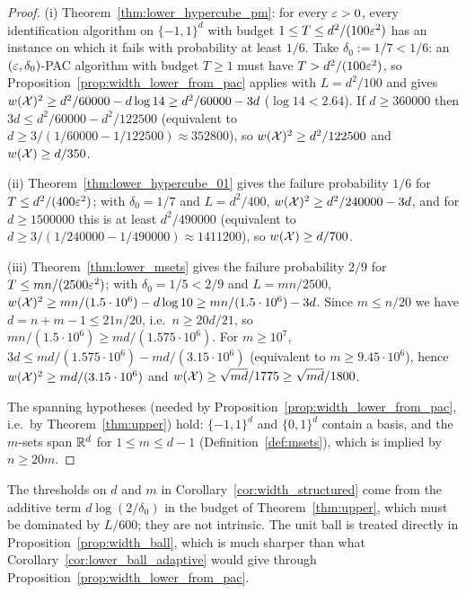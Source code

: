 \begin{proof}
(i) Theorem~\ref{thm:lower_hypercube_pm}: for every $\varepsilon > 0$, every identification
algorithm on $\{-1,1\}^d$ with budget $1 \le T \le d^2/(100\varepsilon^2)$ has an instance on which it
fails with probability at least $1/6$. Take $\delta_0 := 1/7 < 1/6$: an
$(\varepsilon,\delta_0)$-PAC algorithm with budget $T \ge 1$ must have $T > d^2/(100\varepsilon^2)$, so
Proposition~\ref{prop:width_lower_from_pac} applies with $L = d^2/100$ and gives
$w(\mathcal{X})^2 \ge d^2/60000 - d\log 14 \ge d^2/60000 - 3d$ ($\log 14 < 2.64$). If
$d \ge 360000$ then $3d \le d^2/60000 - d^2/122500$ (equivalent to
$d \ge 3/(1/60000 - 1/122500) \approx 352800$), so $w(\mathcal{X})^2 \ge d^2/122500$ and
$w(\mathcal{X}) \ge d/350$.

(ii) Theorem~\ref{thm:lower_hypercube_01} gives the failure probability $1/6$ for
$T \le d^2/(400\varepsilon^2)$; with $\delta_0 = 1/7$ and $L = d^2/400$,
$w(\mathcal{X})^2 \ge d^2/240000 - 3d$, and for $d \ge 1500000$ this is at least
$d^2/490000$ (equivalent to $d \ge 3/(1/240000 - 1/490000) \approx 1411200$), so
$w(\mathcal{X}) \ge d/700$.

(iii) Theorem~\ref{thm:lower_msets} gives the failure probability $2/9$ for
$T \le mn/(2500\varepsilon^2)$; with $\delta_0 = 1/5 < 2/9$ and $L = mn/2500$,
$w(\mathcal{X})^2 \ge mn/(1.5\cdot10^6) - d\log 10 \ge mn/(1.5\cdot 10^6) - 3d$. Since
$m \le n/20$ we have $d = n + m - 1 \le 21n/20$, i.e.\ $n \ge 20d/21$, so
$mn/(1.5\cdot10^6) \ge md/(1.575\cdot10^6)$. For $m \ge 10^7$,
$3d \le md/(1.575\cdot10^6) - md/(3.15\cdot 10^6)$ (equivalent to $m \ge 9.45\cdot10^6$),
hence $w(\mathcal{X})^2 \ge md/(3.15\cdot10^6)$ and $w(\mathcal{X}) \ge \sqrt{md}/1775 \ge \sqrt{md}/1800$.

The spanning hypotheses (needed by Proposition~\ref{prop:width_lower_from_pac}, i.e.\ by
Theorem~\ref{thm:upper}) hold: $\{-1,1\}^d$ and $\{0,1\}^d$ contain a basis, and the
$m$-sets span $\mathbb{R}^d$ for $1 \le m \le d-1$ (Definition~\ref{def:msets}), which is implied by
$n \ge 20m$.
\end{proof}

\begin{remark}
The thresholds on $d$ and $m$ in Corollary~\ref{cor:width_structured} come from the additive
term $d\log(2/\delta_0)$ in the budget of Theorem~\ref{thm:upper}, which must be dominated
by $L/600$; they are not intrinsic. The unit ball is treated directly in
Proposition~\ref{prop:width_ball}, which is much sharper than what
Corollary~\ref{cor:lower_ball_adaptive} would give through
Proposition~\ref{prop:width_lower_from_pac}.
\end{remark}

